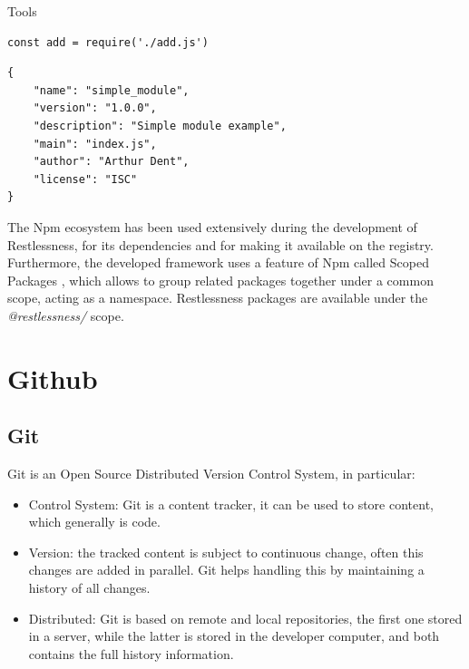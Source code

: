 \begin{chapter}{Tools}
    \bigskip
    \begin{lstlisting}[caption=CommonJs module usage]
const add = require('./add.js')
    \end{lstlisting}

    \bigskip
    \begin{lstlisting}[caption=A simple \textit{package.json}]
{
    "name": "simple_module",
    "version": "1.0.0",
    "description": "Simple module example",
    "main": "index.js",
    "author": "Arthur Dent",
    "license": "ISC"
}
    \end{lstlisting}

    The Npm ecosystem has been used extensively during the development of Restlessness,
    for its dependencies and for making it available on the registry.
    Furthermore, the developed framework uses a feature of Npm called Scoped Packages
    \cite{npm_scoped_packages}, which allows to group related packages together
    under a common scope, acting as a namespace. Restlessness packages are available
    under the \textit{@restlessness/} scope.

    \section{Github}
    \subsection{Git}
    Git is an Open Source Distributed Version Control System, in particular:
    \begin{itemize}
        \item Control System: Git is a content tracker, it can be used to store
            content, which generally is code.
        \item Version: the tracked content is subject to continuous change, often
            this changes are added in parallel. Git helps handling this by maintaining
            a history of all changes.
        \item Distributed: Git is based on remote and local repositories, the first
            one stored in a server, while the latter is stored in the developer
            computer, and both contains the full history information.
    \end{itemize}


\end{chapter}
